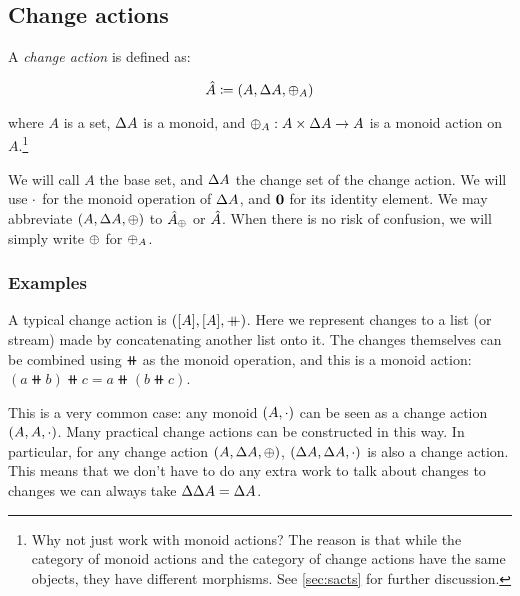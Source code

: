 \subsection{Change actions}
\label{sec:changeAction}

\begin{defn}
  A \emph{change action} is defined as:

  \begin{displaymath}
    \hat{A} \coloneqq (A,\Delta A,\oplus_A)
  \end{displaymath}

  where $A$ is a set, $\Delta A$ is a monoid, and $\oplus_A : A \times \Delta A \rightarrow A$ is a monoid action on $A$.\footnote{Why not
    just work with monoid actions? The reason is that while the category of
    monoid actions and the category of change actions have the same objects, they
  have different morphisms. See \cref{sec:sacts} for further discussion.}

  We will call $A$ the base set, and $\Delta A$ the change set of the change
  action. We will use $\cdot$ for the monoid operation of $\Delta A$, and
  $\mathbf{0}$ for its identity element. We may abbreviate $(A,\Delta A,\oplus)$ to $\hat{A}_\oplus$ or $\hat{A}$. When there is no risk of confusion, we will simply write $\oplus$ for $\oplus_A$.
\end{defn}

\subsubsection{Examples}

A typical change action is $([A],[A],\mathbin{+\mkern-10mu+})$. Here we represent changes
to a list (or stream) made by concatenating another list onto it. The changes
themselves can be combined using $\doubleplus$ as the monoid operation, and this
is a monoid action: $(a \doubleplus b) \doubleplus c = a \doubleplus \left( b \doubleplus c \right)$.

This is a very common case: any monoid $(A, \cdot)$ can be seen as a change action
$(A,A,\cdot)$. Many practical change actions
can be constructed in this way. In particular, for any change action $(A,\Delta A,\oplus)$,
$(\Delta A,\Delta A,\cdot)$ is also a change action. This means
that we don't have to do any extra work to talk about changes to changes \textemdash{} we can 
always take $\Delta \Delta A = \Delta A$.

